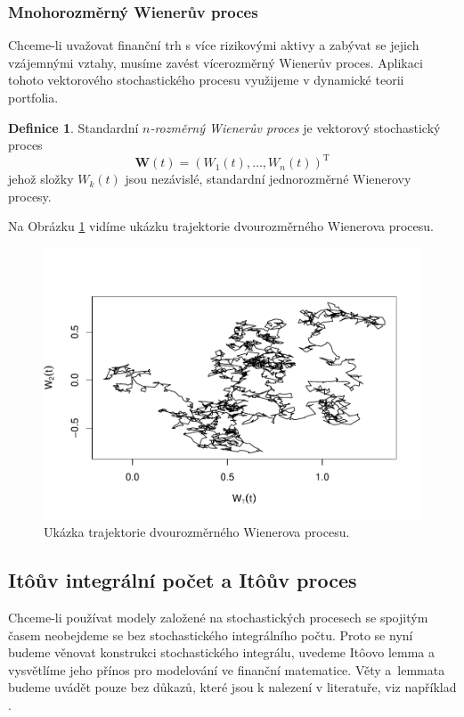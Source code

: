 \documentclass[a4paper,12pt]{report}
\theoremstyle{definition} \newtheorem{definice}[veta]{Definice}
\theoremstyle{remark}
\begin{document}
\subsubsection{Mnohorozměrný Wienerův proces}
Chceme-li uvažovat finanční trh s více rizikovými aktivy a zabývat se jejich vzájemnými vztahy, musíme zavést vícerozměrný Wienerův proces.
Aplikaci tohoto vektorového stochastického procesu využijeme v dynamické teorii portfolia.

\begin{definice}
Standardní \textit{$n$-rozměrný Wienerův proces} je vektorový stochastický proces
$$\boldsymbol{W}(t) = (W_1(t), \dots, W_n(t))^\mathrm{T}$$
jehož složky $W_k(t)$ jsou nezávislé, standardní jednorozměrné Wienerovy procesy.
\end{definice}

Na Obrázku \ref{WP_2D_graf} vidíme ukázku trajektorie dvourozměrného Wienerova procesu.
\begin{figure}[!htbp]
  \centering 
	\includegraphics[width=13.5cm, clip, trim= 0 20 25 50]{IMG/WP_2D_v6.pdf}
  \caption{Ukázka trajektorie dvourozměrného Wienerova procesu.}  \label{WP_2D_graf}
\end{figure}


\subsection{It\^oův integrální počet a It\^oův proces}\label{Ito_kalkul}
Chceme-li používat modely založené na stochastických procesech se spojitým časem neobejdeme se bez stochastického integrálního počtu.
Proto se nyní budeme věnovat konstrukci stochastického integrálu, uvedeme It\^oovo lemma a vysvětlíme jeho přínos pro modelování ve finanční matematice.
Věty a~lemmata budeme uvádět pouze bez důkazů, které jsou k nalezení v literatuře, viz například \cite{karatzas2012brownian}.
\end{document}
